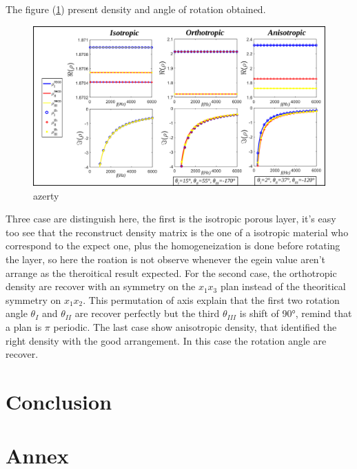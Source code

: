 \documentclass{article}
\begin{document}
    The figure (\ref{Grph_rho_dir}) present density and angle of rotation obtained.

    \begin{figure}[ht!]
        \centering
        \includegraphics[scale=0.4]{Density_dir.png}
        \caption{azerty}
        \label{Grph_rho_dir}
    \end{figure}
    
    Three case are distinguish here, the first is the isotropic porous layer, it's easy too see that the reconstruct density matrix is the one of a isotropic material who correspond to the expect one, plus the homogeneization is done before rotating the layer, so here the roation is not observe whenever the egein value aren't arrange as the theroitical result expected.  For the second case, the orthotropic density are recover with an symmetry on the $x_1x_3$ plan instead of the theoritical symmetry on $x_1x_2$. This permutation of axis explain that the first two rotation angle $\theta_I$ and $\theta_{II}$ are recover perfectly but the third $\theta_{III}$ is shift of 90°, remind that a plan is $\pi$ periodic. The last case show anisotropic density, that identified the right density with the good arrangement. In this case the rotation angle are recover. 
    
\section{Conclusion}


\section{Annex}
\end{document}
